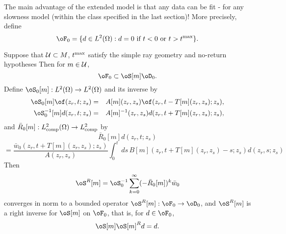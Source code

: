 The main advantage of the extended model is that any data can be fit -
for any slowness model (within the class specified in the last
section)! More precisely, define 
\begin{equation}
\label{eqn:extrange}
\oF_0 = \{d \in L^2(\Omega): d=0 \mbox{ if } t<0 \mbox{ or } t>t^{\rm 
  max} \}. 
\end{equation}
\begin{theorem}
\label{thm:extsur}
Suppose that ${\cal U} \subset M$, $t^{\rm max}$ satisfy the simple 
ray geometry and no-return hypotheses
Then for $m \in {\cal U}$,
\begin{equation}
\label{eqn:extsur}
\oF_0 \subset \oS[m]\oD_0.
\end{equation}
Define $\oS_0[m]: L^2(\Omega) \rightarrow L^2(\Omega)$ and its inverse by
\begin{eqnarray}
\label{eqn:approxrinv}
\oS_0[m]\of(z_r,t;z_s) & = &
A[m](z_r,z_s)\of(z_r,t-T[m](z_r,z_s);z_s),\nonumber\\
\oS_0^{-1}[m]d(z_r,t;z_s) &=&
A[m]^{-1}(z_r,z_s)d(z_r,t+T[m](z_r,z_s);z_s),
\end{eqnarray}
and $\bar{R}_0[m]: L^2_{\rm comp}(\Omega) \rightarrow L^2_{\rm comp}$
by
\[
\bar{R}_0[m]d(z_r,t;z_s) 
\]
\begin{equation}
\label{eqn:approxres}
= \frac{\bar{w}_0(z_r,t+T[m](z_r,z_s);z_s)}{A(z_r,z_s)}
\int_0^t\,ds\,B[m](z_r,t+T[m](z_r,z_s)-s;z_s)d(z_r,s;z_s)
\end{equation}
Then 
\begin{equation}
\label{eqn:rinvdef}
\oS^R[m] = \oS_0^{-1}
\sum_{k=0}^{\infty}(-\bar{R}_0[m])^k \bar{w}_0
\end{equation}
converges in norm to a bounded operator $\oS^R[m]: \oF_0
\rightarrow \oD_0$, and $\oS^R[m]$ is a right inverse
for $\oS[m]$ on $\oF_0$, that is, for $d \in \oF_0$,
\begin{equation}
\label{eqn:invreln}
\oS[m]\oS[m]^Rd = d.
\end{equation}
\end{theorem}

